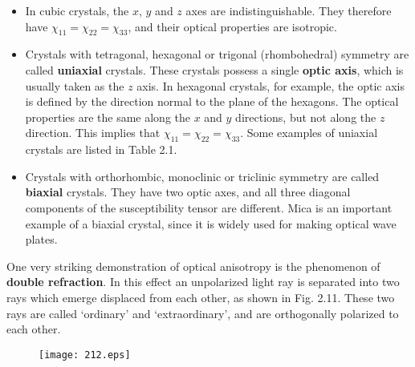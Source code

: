 \documentclass[12pt]{book}
\begin{document}
\begin{itemize}
  \item In cubic crystals, the $x$, $y$ and $z$ axes are indistinguishable. They therefore have $\chi_{11}=\chi_{22}=\chi_{33}$, and their optical properties are isotropic.
  \item Crystals with tetragonal, hexagonal or trigonal (rhombohedral) symmetry are called \textbf{uniaxial} crystals. These crystals possess a single \textbf{optic axis}, which is usually taken as the $z$ axis. In hexagonal crystals, for example, the optic axis is defined by the direction normal to the plane of the hexagons. The optical properties are the same along the $x$ and $y$ directions, but not along the $z$ direction. This implies that $\chi_{11}=\chi_{22}=\chi_{33}$. Some examples of uniaxial crystals are listed in Table 2.1.
  \item Crystals with orthorhombic, monoclinic or triclinic symmetry are called \textbf{biaxial} crystals. They have two optic axes, and all three diagonal components of the susceptibility tensor are different. Mica is an important example of a biaxial crystal, since it is widely used for making optical wave plates.
\end{itemize}

One very striking demonstration of optical anisotropy is the phenomenon of \textbf{double refraction}. In this effect an unpolarized light ray is separated into two rays which emerge displaced from each other, as shown in Fig. 2.11. These two rays are called `ordinary' and `extraordinary', and are orthogonally polarized to each other.

\begin{figure}
  \centering
  \texttt{[image: 212.eps]}\\
  \label{fig:2.12}
\end{figure}
\end{document}
